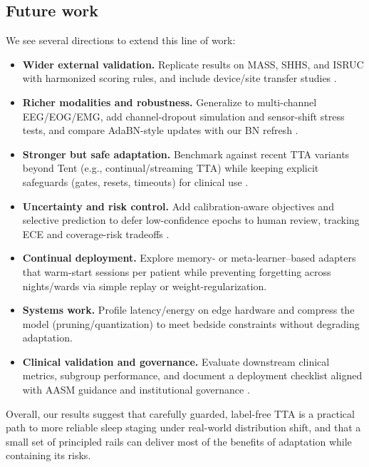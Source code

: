 \documentclass{article}
\begin{document}
\subsection{Future work}
We see several directions to extend this line of work:
\begin{itemize}
    \item \textbf{Wider external validation.} Replicate results on MASS, SHHS, and ISRUC with harmonized scoring rules, and include device/site transfer studies \citep{oreilly2014mass,quan1997shhs,khalighi2016isruc}.
    \item \textbf{Richer modalities and robustness.} Generalize to multi-channel EEG/EOG/EMG, add channel-dropout simulation and sensor-shift stress tests, and compare AdaBN-style updates with our BN refresh \citep{li2016adabn}.
    \item \textbf{Stronger but safe adaptation.} Benchmark against recent TTA variants beyond Tent (e.g., continual/streaming TTA) while keeping explicit safeguards (gates, resets, timeouts) for clinical use \citep{wang2021tent,wang2022cotta}.
    \item \textbf{Uncertainty and risk control.} Add calibration-aware objectives and selective prediction to defer low-confidence epochs to human review, tracking ECE and coverage-risk tradeoffs \citep{guo2017calibration}.
    \item \textbf{Continual deployment.} Explore memory- or meta-learner–based adapters that warm-start sessions per patient while preventing forgetting across nights/wards via simple replay or weight-regularization.
    \item \textbf{Systems work.} Profile latency/energy on edge hardware and compress the model (pruning/quantization) to meet bedside constraints without degrading adaptation.
    \item \textbf{Clinical validation and governance.} Evaluate downstream clinical metrics, subgroup performance, and document a deployment checklist aligned with AASM guidance and institutional governance \citep{berry2012aasm}.
\end{itemize}

Overall, our results suggest that carefully guarded, label-free TTA is a practical path to more reliable sleep staging under real-world distribution shift, and that a small set of principled rails can deliver most of the benefits of adaptation while containing its risks.

\end{document}
